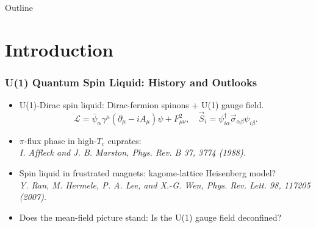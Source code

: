 \documentclass[xcolor=table, 10pt, aspectratio=169]{beamer}
\begin{document}
\begin{frame}{Outline}
		\tableofcontents
\end{frame}

\section{Introduction}

\begin{frame}
  \frametitle{U(1) Quantum Spin Liquid: History and Outlooks}
\begin{itemize}
	\item U(1)-Dirac spin liquid: Dirac-fermion spinons + U(1) gauge field.
	\[\mathcal L = \bar\psi_\alpha \gamma^\mu(\partial_\mu-iA_\mu)\psi +  F_{\mu\nu}^2,\quad
	\vec S_i = \psi^\dagger_{i\alpha}\vec\sigma_{\alpha\beta}\psi_{i\beta}.\]
	\item $\pi$-flux phase in high-$T_c$ cuprates:\\
	\emph{\small I. Affleck and J. B. Marston, Phys. Rev. B 37, 3774 (1988).}
	\item Spin liquid in frustrated magnets: kagome-lattice Heisenberg model?\\
	\emph{\small Y. Ran, M. Hermele, P. A. Lee, and X.-G. Wen, Phys. Rev. Lett. 98, 117205 (2007).}

  \item Does the mean-field picture stand: Is the U(1) gauge field deconfined?
\end{itemize}
\end{frame}

\end{document}
